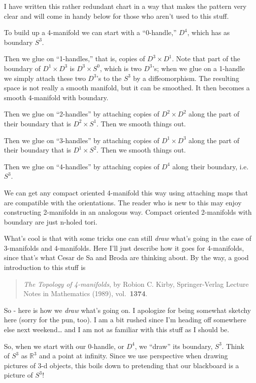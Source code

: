 \documentclass{article}
\begin{document}
I have written this rather redundant chart in a way that makes the
pattern very clear and will come in handy below for those who aren't
used to this stuff.

To build up a 4-manifold we can start with a ``0-handle,'' \(D^4\),
which has as boundary \(S^3\).

Then we glue on ``1-handles,'' that is, copies of \(D^3 \times D^1\).
Note that part of the boundary of \(D^1 \times D^3\) is
\(D^3 \times S^0\), which is two \(D^3\)'s; when we glue on a 1-handle
we simply attach these two \(D^3\)'s to the \(S^3\) by a diffeomorphism.
The resulting space is not really a smooth manifold, but it can be
smoothed. It then becomes a smooth 4-manifold with boundary.

Then we glue on ``2-handles'' by attaching copies of \(D^2 \times D^2\)
along the part of their boundary that is \(D^2 \times S^1\). Then we
smooth things out.

Then we glue on ``3-handles'' by attaching copies of \(D^1 \times D^3\)
along the part of their boundary that is \(D^1 \times S^2\). Then we
smooth things out.

Then we glue on ``4-handles'' by attaching copies of \(D^4\) along their
boundary, i.e.~\(S^3\).

We can get any compact oriented 4-manifold this way using attaching maps
that are compatible with the orientations. The reader who is new to this
may enjoy constructing 2-manifolds in an analogous way. Compact oriented
2-manifolds with boundary are just n-holed tori.

What's cool is that with some tricks one can still \emph{draw} what's
going in the case of 3-manifolds and 4-manifolds. Here I'll just
describe how it goes for 4-manifolds, since that's what Cesar de Sa and
Broda are thinking about. By the way, a good introduction to this stuff
is

\begin{quote}
\emph{The Topology of 4-manifolds}, by Robion C. Kirby, Springer-Verlag
Lecture Notes in Mathematics (1989), vol.~\textbf{1374}.
\end{quote}

So - here is how we \emph{draw} what's going on. I apologize for being
somewhat sketchy here (sorry for the pun, too). I am a bit rushed since
I'm heading off somewhere else next weekend\ldots{} and I am not as
familiar with this stuff as I should be.

So, when we start with our 0-handle, or \(D^4\), we ``draw'' its
boundary, \(S^3\). Think of \(S^3\) as \(\mathbb{R}^3\) and a point at
infinity. Since we use perspective when drawing pictures of 3-d objects,
this boils down to pretending that our blackboard is a picture of
\(S^3\)!
\end{document}
